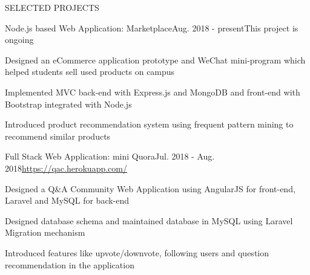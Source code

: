 \documentclass{resume} %
\begin{document}

\begin{rSection}{SELECTED PROJECTS}






\begin{rSubsection}{Node.js based Web Application: Marketplace}{Aug. 2018 - present}{This project is ongoing}{}
\item Designed an eCommerce application prototype and WeChat mini-program which helped students sell used products on campus
\item Implemented MVC back-end with Express.js and MongoDB and front-end with Bootstrap integrated with Node.js
\item Introduced product recommendation system using frequent pattern mining to recommend similar products
\end{rSubsection} 


\begin{rSubsection}{Full Stack Web Application: mini Quora}{Jul. 2018 - Aug. 2018}{\url{https://qac.herokuapp.com/}}{}
\item Designed a Q\&A Community Web Application using AngularJS for front-end, Laravel and MySQL for back-end
\item Designed database schema and maintained database in MySQL using Laravel Migration mechanism
\item Introduced features like upvote/downvote, following users and question recommendation in the application
\end{rSubsection} 


\end{rSection}
\end{document}
